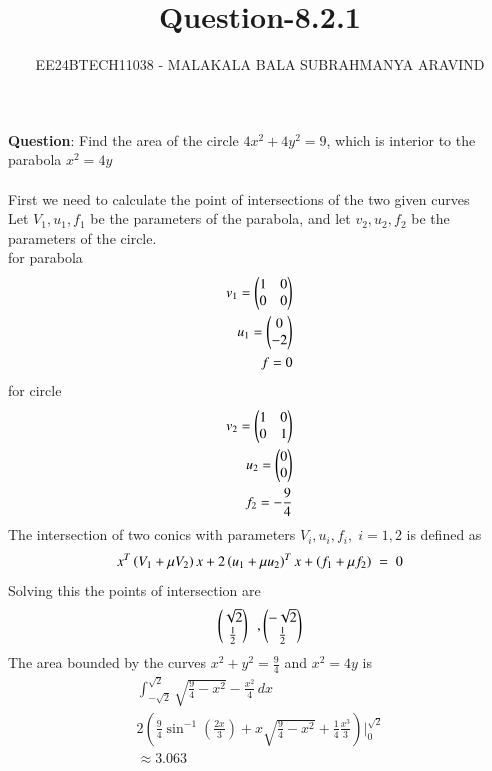 \documentclass[journal]{IEEEtran}
\numberwithin{equation}{enumi}
\numberwithin{figure}{enumi}
\begin{document}

\title{Question-8.2.1}
\author{EE24BTECH11038 - MALAKALA BALA SUBRAHMANYA ARAVIND}
{\let\newpage\relax\maketitle}
\textbf{Question}:
Find the area of the circle $4x^2+4y^2=9$, which is interior to the parabola $x^2=4y$\\
\solution \\


First we need to calculate the point of intersections of the two given curves\\
Let $V_1,u_1,f_1$ be the parameters of the parabola, and let $v_2,u_2,f_2$ be the parameters of the circle.\\
for parabola 
\begin{align}
    v_1=\begin{pmatrix}1 &0 \\ 0 & 0\end{pmatrix}\\
    u_1=\begin{pmatrix}0\\-2\end{pmatrix}\\
    f=0
\end{align}
for circle
\begin{align}
    v_2=\begin{pmatrix}1 &0 \\ 0& 1\end{pmatrix}\\
    u_2=\begin{pmatrix}0\\0\end{pmatrix}\\
    f_2=-\frac{9}{4}
\end{align}
The intersection of two conics with parameters $V_i,u_i,f_i,\;i= 1,2$ is defined as
\begin{align}
x^T\left(V_1+\mu V_2\right)x+2\left(u_1+\mu u_2\right)^T x + \left(f_1+\mu f_2\right)\;=\;0
\end{align}
Solving this the points of intersection are 
\begin{align}
\begin{pmatrix}\sqrt{2}\\\frac{1}{2}\end{pmatrix}\,\,\, , \begin{pmatrix}-\sqrt{2}\\\frac{1}{2}\end{pmatrix}
\end{align}
The area bounded by the curves $x^2+y^2=\frac{9}{4}$ and $x^2=4y$ is 
\begin{align}
    \int_{-\sqrt{2}}^{\sqrt{2}} \sqrt{\frac{9}{4}-x^2}-\frac{x^2}{4} \, dx \\
    2 \left( \frac{9}{4} \sin^{-1} \left( \frac{2x}{3} \right) + x \sqrt{\frac{9}{4} - x^2} + \frac{1}{4} \frac{x^3}{3} \right) \Bigg|_0^{\sqrt{2}} \\
    \approx 3.063
\end{align}
\end{document}

